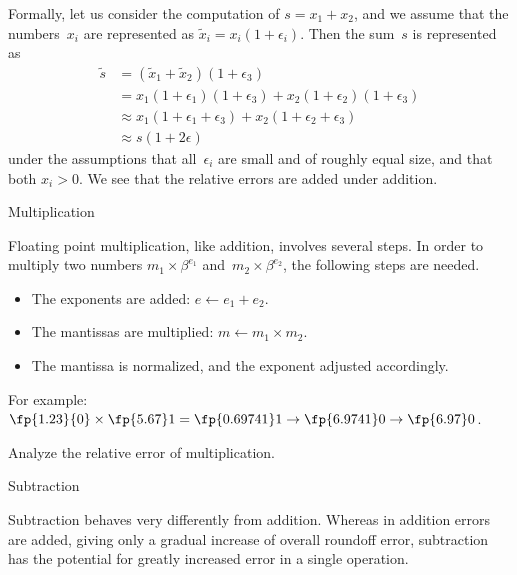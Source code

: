Formally, let us consider the computation of
$s=x_1+x_2$, and we assume that the numbers~$x_i$ are represented
as $\tilde x_i=x_i(1+\epsilon_i)$.
Then the sum~$s$ is represented as
\begin{equation}
\begin{array}{rl}
\tilde s&=(\tilde x_1+\tilde x_2)(1+\epsilon_3)\\
&=x_1(1+\epsilon_1)(1+\epsilon_3)+x_2(1+\epsilon_2)(1+\epsilon_3)\\
&\approx x_1(1+\epsilon_1+\epsilon_3)+x_2(1+\epsilon_2+\epsilon_3)\\
&\approx s(1+2\epsilon)
\end{array}
\end{equation}
under the assumptions that all~$\epsilon_i$ are small and of roughly
equal size, and that both $x_i>0$.
We see that the relative errors are added under addition.

 {Multiplication}

Floating point multiplication, like addition, involves several steps.
In order to multiply two numbers $m_1\times\beta^{e_1}$
and~$m_2\times\beta^{e_2}$, the following steps are needed.
\begin{itemize}
\item The exponents are added: $e\leftarrow e_1+e_2$.
\item The mantissas are multiplied: $m\leftarrow
  m_1\times m_2$.
\item The mantissa is normalized, and the exponent adjusted accordingly.
\end{itemize}

For example: $\fp{1.23}{0}\times\fp{5.67}1=\fp{0.69741}1\rightarrow
\fp{6.9741}0\rightarrow\fp{6.97}0$.

\begin{exercise}
  Analyze the relative error of multiplication.
\end{exercise}

 {Subtraction}
\label{sec:subtraction}

Subtraction behaves very differently from addition. Whereas in
addition errors are added, giving only a gradual increase of overall
roundoff error, subtraction has the potential for greatly increased
error in a single operation. 

